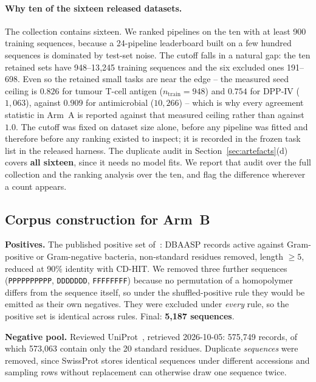\documentclass[11pt,a4paper]{article}
\begin{document}
\paragraph{Why ten of the sixteen released datasets.} The collection contains sixteen. We
ranked pipelines on the ten with at least 900 training sequences, because a 24-pipeline
leaderboard built on a few hundred sequences is dominated by test-set noise. The cutoff
falls in a natural gap: the ten retained sets have 948--13{,}245 training sequences and the
six excluded ones 191--698. Even so the retained small tasks are near the edge -- the
measured seed ceiling is $0.826$ for tumour T-cell antigen ($n_\text{train}=948$) and
$0.754$ for DPP-IV ($1{,}063$), against $0.909$ for antimicrobial ($10{,}266$) -- which is
why every agreement statistic in Arm~A is reported against that measured ceiling rather
than against $1.0$. The cutoff was fixed on dataset size alone, before any
pipeline was fitted and therefore before any ranking existed to inspect; it is recorded in
the frozen task list in the released harness. The duplicate audit in
Section~\ref{sec:artefacts}(d) covers \textbf{all sixteen}, since it needs no model fits.
We report that audit over the full collection and the ranking analysis over the ten, and
flag the difference wherever a count appears.

\subsection{Corpus construction for Arm~B}

\textbf{Positives.} The published positive set of~\citet{sidorczuk2022negative}: DBAASP
records active against Gram-positive or Gram-negative bacteria, non-standard residues
removed, length $\geq 5$, reduced at 90\% identity with CD-HIT. We removed three further
sequences (\texttt{PPPPPPPPPP}, \texttt{DDDDDDD}, \texttt{FFFFFFFF}) because no permutation
of a homopolymer differs from the sequence itself, so under the shuffled-positive rule they
would be emitted as their own negatives. They were excluded under \emph{every} rule, so the
positive set is identical across rules. Final: \textbf{5{,}187 sequences}.

\textbf{Negative pool.} Reviewed UniProt~\citep{uniprot2025}, retrieved 2026-10-05:
575{,}749 records, of which 573{,}063 contain only the 20 standard residues. Duplicate
\emph{sequences} were removed, since SwissProt stores identical sequences under different
accessions and sampling rows without replacement can otherwise draw one sequence twice.
\end{document}
